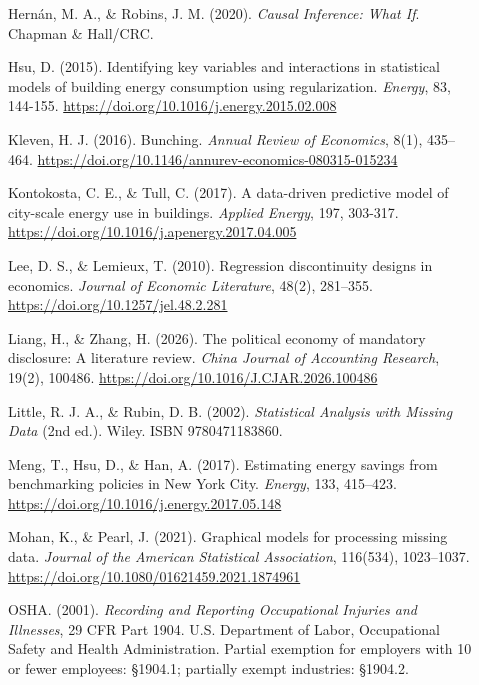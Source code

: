 \begin{description}
\item[] \hypertarget{hernanrobins2020}{}Hernán, M. A., \& Robins, J. M. (2020). \textit{Causal Inference: What If}. Chapman \& Hall/CRC.
\item[] \hypertarget{hsu2015}{}Hsu, D. (2015). Identifying key variables and interactions in statistical models of building energy consumption using regularization. \textit{Energy}, 83, 144-155. \url{https://doi.org/10.1016/j.energy.2015.02.008}
\item[] \hypertarget{kleven2016}{}Kleven, H. J. (2016). Bunching. \textit{Annual Review of Economics}, 8(1), 435--464. \url{https://doi.org/10.1146/annurev-economics-080315-015234}
\item[] \hypertarget{kontokostatull2017}{}Kontokosta, C. E., \& Tull, C. (2017). A data-driven predictive model of city-scale energy use in buildings. \textit{Applied Energy}, 197, 303-317. \url{https://doi.org/10.1016/j.apenergy.2017.04.005}
\item[] \hypertarget{leelemieux2010}{}Lee, D. S., \& Lemieux, T. (2010). Regression discontinuity designs in economics. \textit{Journal of Economic Literature}, 48(2), 281--355. \url{https://doi.org/10.1257/jel.48.2.281}
\item[] \hypertarget{liangzhang2026}{}Liang, H., \& Zhang, H. (2026). The political economy of mandatory disclosure: A literature review. \textit{China Journal of Accounting Research}, 19(2), 100486. \url{https://doi.org/10.1016/J.CJAR.2026.100486}
\item[] \hypertarget{littlerubin2002}{}Little, R. J. A., \& Rubin, D. B. (2002). \textit{Statistical Analysis with Missing Data} (2nd ed.). Wiley. ISBN 9780471183860.
\item[] \hypertarget{mengetal2017}{}Meng, T., Hsu, D., \& Han, A. (2017). Estimating energy savings from benchmarking policies in New York City. \textit{Energy}, 133, 415--423. \url{https://doi.org/10.1016/j.energy.2017.05.148}
\item[] \hypertarget{mohanpearl2021}{}Mohan, K., \& Pearl, J. (2021). Graphical models for processing missing data. \textit{Journal of the American Statistical Association}, 116(534), 1023--1037. \url{https://doi.org/10.1080/01621459.2021.1874961}
\item[] \hypertarget{osha2001}{}OSHA. (2001). \textit{Recording and Reporting Occupational Injuries and Illnesses}, 29 CFR Part 1904. U.S. Department of Labor, Occupational Safety and Health Administration. Partial exemption for employers with 10 or fewer employees: §1904.1; partially exempt industries: §1904.2.

\end{description}
